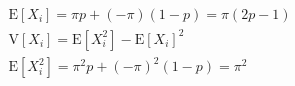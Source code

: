 \documentclass[preview]{standalone}
\begin{document}
\begin{align*}
\mathrm{E}\left[X_{i}\right]=\pi p + (-\pi)(1 - p) =\pi(2p - 1) \\\mathrm{V}\left[X_{i}\right]=\mathrm{E}\left[X_{i}^{2}\right]-\mathrm{E}\left[X_{i}\right]^{2} \\\mathrm{E}\left[X_{i} ^ {2}\right]=\pi^{2} p + (-\pi) ^ {2}(1 - p) =\pi ^ {2}
\end{align*}
\end{document}

